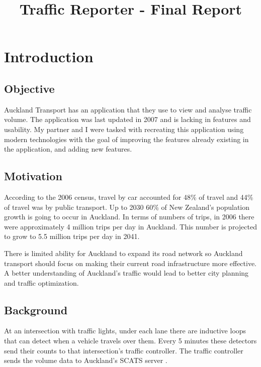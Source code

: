 \documentclass{article}
\title{Traffic Reporter - Final Report}
\begin{document}


\maketitle

\begin{abstract}

\end{abstract}

\section{Introduction}
\subsection{Objective}
Auckland Transport has an application that they use to view and analyse traffic volume. The application was last updated in 2007 and is lacking in features and usability. My partner and I were tasked with recreating this application using modern technologies with the goal of improving the features already existing in the application, and adding new features.

\subsection{Motivation}
According to the 2006 census, travel by car accounted for 48\% of travel and 44\% of travel was by public transport. Up to 2030 60\% of New Zealand's population growth is going to occur in Auckland. In terms of numbers of trips, in 2006 there were approximately 4 million trips per day in Auckland. This number is projected to grow to 5.5 million trips per day in 2041.

There is limited ability for Auckland to expand its road network so Auckland transport should focus on making their current road infrastructure more effective. A better understanding of Auckland's traffic would lead to better city planning and traffic optimization.

\subsection{Background}

At an intersection with traffic lights, under each lane there are inductive loops that can detect when a vehicle travels over them. Every 5 minutes these detectors send their counts to that intersection's traffic controller. The traffic controller sends the volume data to Auckland's SCATS server \cite{sims1981scat}. 
\end{document}
